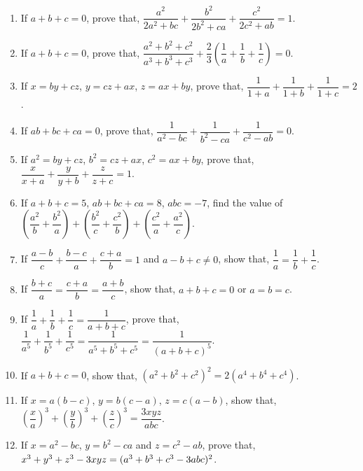 \documentclass[11pt, a4paper]{article}
\begin{document}
\begin{enumerate}
	\item If $a+b+c=0$, prove that, $\dfrac{a^2}{2a^2 + bc} + \dfrac{b^2}{2b^2+ca} + \dfrac{c^2}{2c^2+ab} = 1$.

	\item If $a+b+c=0$, prove that, $\dfrac{a^2+b^2+c^2}{a^3+b^3+c^3} + \dfrac{2}{3}\left( \dfrac{1}{a} + \dfrac{1}{b} + \dfrac{1}{c} \right) = 0$.
	
	\item If $x = by + cz$, $y = cz + ax$, $z = ax + by$, prove that, $\dfrac{1}{1+a} + \dfrac{1}{1+b} + \dfrac{1}{1+c} = 2$.
	
	\item If $ab+bc+ca = 0$, prove that, $\dfrac{1}{a^2 - bc} + \dfrac{1}{b^2 - ca} + \dfrac{1}{c^2 - ab} = 0$.
	
	\item If $a^2 = by + cz$, $b^2 = cz + ax$, $c^2 = ax + by$, prove that, $\dfrac{x}{x+a} + \dfrac{y}{y+b} + \dfrac{z}{z+c} = 1$.
	
	\item If $a+b+c=5$, $ab+bc+ca=8$, $abc=-7$, find the value of $\left( \dfrac{a^2}{b} + \dfrac{b^2}{a} \right) + \left( \dfrac{b^2}{c} + \dfrac{c^2}{b} \right) + \left( \dfrac{c^2}{a} + \dfrac{a^2}{c} \right)$.
	
	\item If $\dfrac{a-b}{c} + \dfrac{b-c}{a} + \dfrac{c+a}{b} = 1$ and $a-b+c \neq 0$, show that, $\dfrac{1}{a} = \dfrac{1}{b} + \dfrac{1}{c}$.
	
	\item If $\dfrac{b+c}{a} = \dfrac{c+a}{b} = \dfrac{a+b}{c}$, show that, $a+b+c=0$ or $a=b=c$.
	
	\item If $\dfrac{1}{a} + \dfrac{1}{b} + \dfrac{1}{c} = \dfrac{1}{a+b+c}$, prove that, $\dfrac{1}{a^5} + \dfrac{1}{b^5} + \dfrac{1}{c^5} = \dfrac{1}{a^5 + b^5 + c^5} = \dfrac{1}{(a+b+c)^5}$.
	
	\item If $a+b+c=0$, show that, $(a^2 + b^2 + c^2)^2 = 2(a^4 + b^4 + c^4)$.
	
	\item If $x=a(b-c)$, $y=b(c-a)$, $z=c(a-b)$, show that, $\left( \dfrac{x}{a} \right)^3 + \left( \dfrac{y}{b} \right)^3 + \left( \dfrac{z}{c} \right)^3 = \dfrac{3xyz}{abc}$.
	
	\item If $x=a^2-bc$, $y=b^2-ca$ and $z=c^2-ab$, prove that, $x^3+y^3+z^3-3xyz = \\ (a^3+b^3+c^3-3abc)^2$.


\end{enumerate}
\end{document}
